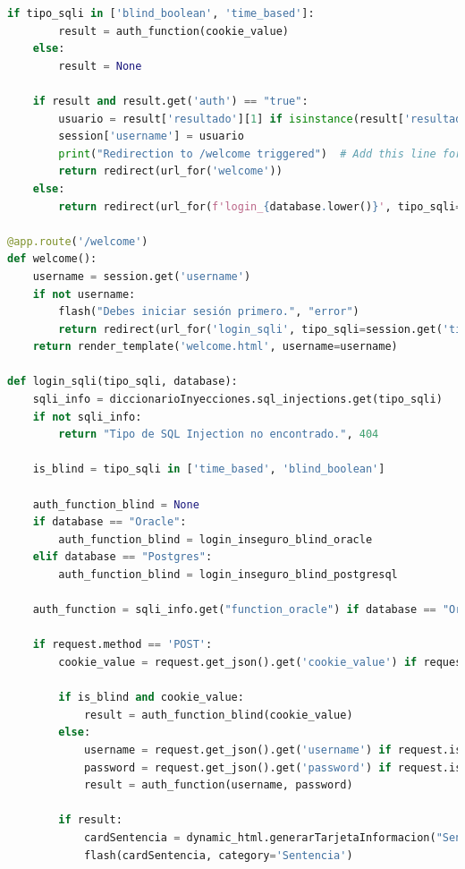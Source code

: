 \documentclass[a4paper,12pt]{article}
\begin{document}
\begin{lstlisting}[language=Python]
    if tipo_sqli in ['blind_boolean', 'time_based']:
        result = auth_function(cookie_value)
    else:
        result = None

    if result and result.get('auth') == "true":
        usuario = result['resultado'][1] if isinstance(result['resultado'], tuple) and len(result['resultado']) > 1 else "Usuario"
        session['username'] = usuario
        print("Redirection to /welcome triggered")  # Add this line for logging
        return redirect(url_for('welcome'))
    else:
        return redirect(url_for(f'login_{database.lower()}', tipo_sqli=tipo_sqli, database=database))

@app.route('/welcome')
def welcome():
    username = session.get('username')
    if not username:
        flash("Debes iniciar sesión primero.", "error")
        return redirect(url_for('login_sqli', tipo_sqli=session.get('tipo_sqli'), database=session.get('database')))
    return render_template('welcome.html', username=username)

def login_sqli(tipo_sqli, database):
    sqli_info = diccionarioInyecciones.sql_injections.get(tipo_sqli)
    if not sqli_info:
        return "Tipo de SQL Injection no encontrado.", 404

    is_blind = tipo_sqli in ['time_based', 'blind_boolean']

    auth_function_blind = None
    if database == "Oracle":
        auth_function_blind = login_inseguro_blind_oracle
    elif database == "Postgres":
        auth_function_blind = login_inseguro_blind_postgresql

    auth_function = sqli_info.get("function_oracle") if database == "Oracle" else sqli_info.get("function_postgres")

    if request.method == 'POST':
        cookie_value = request.get_json().get('cookie_value') if request.is_json else request.form.get('cookie_value')

        if is_blind and cookie_value:
            result = auth_function_blind(cookie_value)
        else:
            username = request.get_json().get('username') if request.is_json else request.form.get('username')
            password = request.get_json().get('password') if request.is_json else request.form.get('password')
            result = auth_function(username, password)

        if result:
            cardSentencia = dynamic_html.generarTarjetaInformacion("Sentencia SQL", result.get('sentencia', ''))
            flash(cardSentencia, category='Sentencia')


\end{lstlisting}
\end{document}
